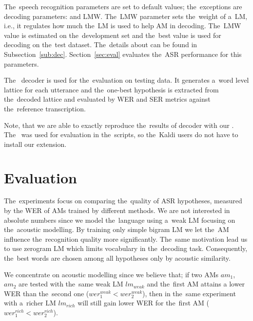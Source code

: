 The~speech recognition parameters are set to default values; the~exceptions are decoding parameters:  and \acl{LMW}. 
The~\ac{LMW} parameter sets the~weight of a~\ac{LM}, i.e., it regulates how much the~\ac{LM} is used to help \ac{AM} in decoding. 
The~\ac{LMW} value is estimated on the~development set and the~best value is used for decoding on the~test dataset.
The~details about  can be found in Subsection~\ref{sub:dec}.
Section~\ref{sec:eval} evaluates the~\ac{ASR} performance for this parameters.

The~ decoder is used for the~evaluation on testing data.
It generates a~word level lattice for each utterance and the~one-best hypothesis is extracted from the~decoded lattice and evaluated by \ac{WER} and \ac{SER} metrics against the~reference transcription.

Note, that we are able to exactly reproduce the~results of  decoder with our .
The~ was used for evaluation in the~scripts, so the~Kaldi users do not have to install our extension.

\section{Evaluation}
\label{sec:am_eval}

The~experiments focus on comparing the~quality of ASR hypotheses, measured by the \ac{WER} of \acp{AM} trained by different methods.
We are not interested in absolute numbers since we model the~language using a~weak \ac{LM} focusing on the~acoustic modelling.
By training only simple bigram \ac{LM} we let the~\ac{AM} influence the~recognition quality more significantly. 
The~same motivation lead us to use zerogram \ac{LM} which limits vocabulary in the~decoding task. %
Consequently, the~best words are chosen among all hypotheses only by acoustic similarity.

We concentrate on acoustic modelling since we believe that; if two \acp{AM} $am_1$, $am_2$ are tested with the~same weak \acl{LM} $lm_{weak}$ and the~first \ac{AM} attains a lower \ac{WER} than the~second one ($wer^{weak}_{1} <  wer^{weak}_{2}$), then in the~same experiment with a~richer \ac{LM} $lm_{rich}$ will still gain lower \ac{WER} for the~first \ac{AM} ($wer^{rich}_{1} <  wer^{rich}_{2}$).

